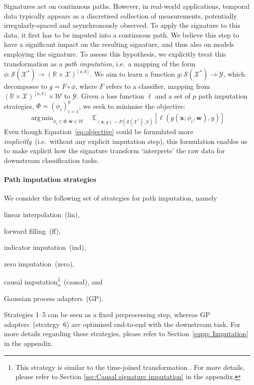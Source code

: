 \documentclass{article}
\DeclareMathOperator*{\argmin}{arg\,min}
\newcommand{\reals}{\mathbb{R}}
\newcommand{\dataspace}{\mathcal{X}}
\newcommand{\lspace}{\mathcal{Y}}
\newcommand{\seriesspace}{\mathcal{S}}
\begin{document}
Signatures act on continuous paths. However, in real-world
applications, temporal data typically appears as a discretised
collection of measurements, potentially irregularly-spaced and
asynchronously observed. To apply the signature to this data,
it first has to be imputed into a continuous path.
%
We believe this step to have a significant impact on the
resulting signature, and thus also on models employing the signature.
To assess this hypothesis, we explicitly treat this transformation
as a \emph{path imputation}, i.e.\ a mapping of the form $ \phi \colon \seriesspace(\dataspace^*) \to (\reals \times \dataspace)^{[a, b]}.$
%
We aim to learn a function $ g \colon \seriesspace(\dataspace^*) \to
\lspace$, which decomposes to $g = F \circ \phi$, where $F$ refers to
a classifier, mapping from $(\reals \times \dataspace)^{[a, b]} \times \mathcal{W} $ to
$\lspace$. Given a loss function $\ell$ and a set of $p$ path
imputation strategies, ${\Phi} =(\phi_i)_{i=1}^p$, we seek to minimise the
objective:
%
\begin{equation}
    \argmin_{\phi_i \in \Phi, \mathbf{w} \in \mathcal{W}} \quad \mathbb{E}_{(\mathbf{x},y) \sim P(\seriesspace(\dataspace^*),\lspace) } \left[ \ell( g(\mathbf{x}; \phi_i, \mathbf{w}), y) \right]
    \label{eq:objective}
\end{equation} 
%
Even though Equation~\eqref{eq:objective} could be formulated more
\emph{implicitly}~(i.e.\ without any explicit imputation step),
this formulation enables us to make explicit how the signature transform
`interprets' the raw data for downstream classification tasks. 

\paragraph{Path imputation strategies}
We consider the following set of strategies for path imputation, namely
\begin{inparaenum}[(1)]
    \item linear interpolation~(lin),
    \item forward filling~(ff),
    \item indicator imputation~(ind),
    \item zero imputation~(zero),
    \item causal imputation\footnote{This strategy is similar to the
      time-joined transformation \citep{levin2013}. For more details,
    please refer to Section \ref{sec:Causal signature imputation} in the
  appendix.}~(causal), and
    \item Gaussian process adapters~(GP).
\end{inparaenum}
%
Strategies 1--5 can be seen as a fixed preprocessing step, whereas GP
adapters~(strategy~6) are optimised end-to-end with the downstream task. For more
details regarding these strategies, please refer to Section~\ref{supp: Imputation} in the
appendix.
\end{document}
